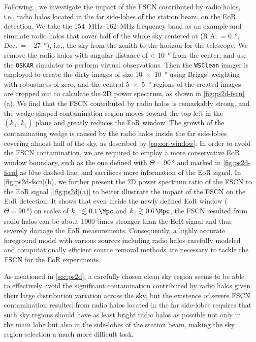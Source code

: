 \documentclass[modern]{aastex62}
\newcommand{\klos}{\text{$k_{\parallel}$}}
\newcommand{\kperp}{\text{$k_{\bot}$}}
\begin{document}
{Following \citet{mort2017}, we investigate the impact of the FSCN
contributed by radio halos, i.e., radio halos located in the far
side-lobes of the station beam, on the EoR detection.
We take the \SIrange{154}{162}{\MHz} frequency band as an example and
simulate radio halos that cover half of the whole sky centered at
(R.A.\ = \SI{0}{\degree}, Dec.\ = \SI{-27}{\degree}), i.e.,
the sky from the zenith to the horizon for the telescope.
We remove the radio halos with angular distance of \SI{< 10}{\degree}
from the center, and use the \texttt{OSKAR} simulator to perform virtual
observations.
Then the \texttt{WSClean} imager is employed to create the dirty images
of size \SI[product-units=repeat]{10 x 10}{\degree} using Briggs'
weighting with robustness of zero,
and the central \SI[product-units=repeat]{5 x 5}{\degree} regions of
the created images are cropped out to calculate the 2D power spectrum,
as shown in \autoref{fig:ps2d-fscn}(a).
We find that the FSCN contributed by radio halos is remarkably strong,
and the wedge-shaped contamination region moves toward the top left in
the $(\kperp, \klos)$ plane and greatly reduces the EoR window.
The growth of the contaminating wedge is caused by the radio halos
inside the far side-lobes covering almost half of the sky, as described
by \autoref{eq:eor-window}.
In order to avoid the FSCN contamination, we are required to employ a
more conservative EoR window boundary, such as the one defined with
$\Theta = \SI{90}{\degree}$ and marked in \autoref{fig:ps2d-fscn} as
blue dashed line, and sacrifices more information of the EoR signal.
In \autoref{fig:ps2d-fscn}(b), we further present the 2D power spectrum
ratio of the FSCN to the EoR signal [\autoref{fig:ps2d}(a)] to better
illustrate the impact of the FSCN on the EoR detection.
It shows that even inside the newly defined EoR window
($\Theta = \SI{90}{\degree}$) on scales of
$\kperp \lesssim \SI{0.1}{\per\Mpc}$ and $\klos \gtrsim \SI{0.6}{\per\Mpc}$,
the FSCN resulted from radio halos can be about 1000 times stronger
than the EoR signal and thus severely damage the EoR measurements.
Consequently, a highly accurate foreground model with various sources
including radio halos carefully modeled and computationally efficient
source removal methods are necessary to tackle the FSCN for the EoR
experiments.

As mentioned in \autoref{sec:ps2d}, a carefully chosen clean sky region
seems to be able to effectively avoid the significant contamination
contributed by radio halos given their large distribution variation
across the sky, but the existence of severe FSCN contamination resulted
from radio halos located in the far side-lobes requires that such sky
regions should have as least bright radio halos as possible not only in
the main lobe but also in the side-lobes of the station beam,
making the sky region selection a much more difficult task.
} %
\end{document}
